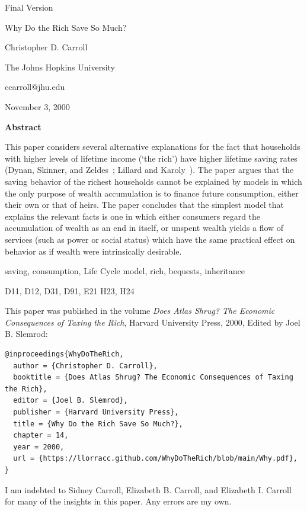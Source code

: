 \documentclass{article}
\begin{document}
      

\begin{titlepage}
\hfill Final Version

\vspace{.75in}
{\centerline {\LARGE Why Do the Rich Save So Much?}}
\vspace{0.5in}


\centerline{Christopher D. Carroll}
\centerline{The Johns Hopkins University}
\centerline{ccarroll@jhu.edu}

\medskip\medskip


\centerline{November 3, 2000}


\vspace{0.1in}

\centerline{\bf Abstract}

This paper considers several alternative explanations for the fact 
that households with higher levels of lifetime income (`the rich') 
have higher lifetime saving rates (Dynan, Skinner, and 
Zeldes~\cite{dsz:richsave}; Lillard and 
Karoly~\cite{lillard&karoly:richsave}).  The paper argues that the 
saving behavior of the richest households cannot be explained by 
models in which the only purpose of wealth accumulation is to finance 
future consumption, either their own or that of heirs.  The paper 
concludes that the simplest model that explains the relevant facts is 
one in which either consumers regard the accumulation of wealth as an 
end in itself, or unspent wealth yields a flow of services (such as 
power or social status) which have the same practical effect on 
behavior as if wealth were intrinsically desirable.

\vspace{.2in}
 saving, consumption, Life Cycle model, rich, 
bequests, inheritance

\medskip
{} D11, D12, D31, D91, E21 H23, H24 

\medskip \medskip This paper was published in the volume {\it Does Atlas Shrug?
The Economic Consequences of Taxing the Rich}, Harvard University Press, 
2000, Edited by Joel B. Slemrod:

\begin{tiny}
\begin{verbatim}
@inproceedings{WhyDoTheRich,
  author = {Christopher D. Carroll},
  booktitle = {Does Atlas Shrug? The Economic Consequences of Taxing the Rich},
  editor = {Joel B. Slemrod},
  publisher = {Harvard University Press},
  title = {Why Do the Rich Save So Much?},
  chapter = 14,
  year = 2000,
  url = {https://llorracc.github.com/WhyDoTheRich/blob/main/Why.pdf},
}
\end{verbatim}
\end{tiny}

{\small I am indebted to Sidney Carroll, Elizabeth B. 
Carroll, and Elizabeth I. Carroll for many of the insights in this 
paper.  Any errors are my own.}

\end{titlepage}
\end{document}
